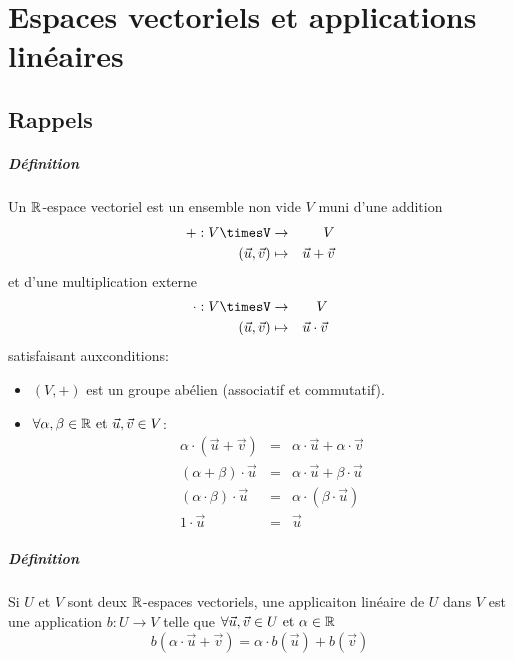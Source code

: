 \chapter{Espaces vectoriels et applications linéaires}

%
%
\section{Rappels}
%
%
\paragraph{Définition} Un $\mathbb{R}$-espace vectoriel est un ensemble non vide $V$ muni d'une addition
\begin{eqnarray*}
  +: V\timesV &\rightarrow& V \\
  (\vec{u}, \vec{v}) &\mapsto& \vec{u}+\vec{v}
\end{eqnarray*}
et d'une multiplication externe
\begin{eqnarray*}
  \cdot: V\timesV &\rightarrow& V \\
  (\vec{u}, \vec{v}) &\mapsto& \vec{u}\cdot\vec{v}
\end{eqnarray*}
satisfaisant auxconditions:
\begin{itemize}
  \item $(V, +)$ est un groupe abélien (associatif et commutatif).
  \item $\forall \alpha, \beta \in \mathbb{R} \text{ et } \vec{u}, \vec{v} \in V$:
    \begin{eqnarray*}
      \alpha \cdot (\vec{u} + \vec{v}) &=& \alpha \cdot \vec{u} + \alpha \cdot \vec{v} \\
      (\alpha + \beta) \cdot \vec{u} &=& \alpha \cdot \vec{u} + \beta \cdot \vec{u} \\
      (\alpha \cdot \beta)\cdot \vec{u} &=& \alpha \cdot (\beta \cdot \vec{u}) \\
      1 \cdot \vec{u} &=& \vec{u}
    \end{eqnarray*}
\end{itemize}

\paragraph{Définition} Si $U$ et $V$ sont deux $\mathbb{R}$-espaces vectoriels, une applicaiton linéaire de $U$ dans $V$ est une application $b: U \rightarrow V$ telle que $\forall \vec{u}, \vec{v} \in U \text{ et } \alpha \in \mathbb{R}$
$$b(\alpha \cdot \vec{u} +\vec{v}) = \alpha \cdot b(\vec{u}) + b(\vec{v})$$

